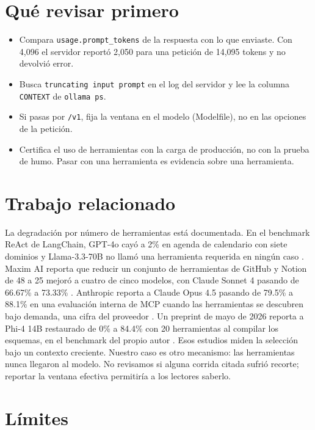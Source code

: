 \documentclass[10pt]{article}
\begin{document}
\section{Qué revisar primero}

\begin{itemize}
\item Compara \texttt{usage.prompt\_tokens} de la respuesta con lo que enviaste. Con 4,096 el servidor reportó 2,050 para una petición de 14,095 tokens y no devolvió error.
\item Busca \texttt{truncating input prompt} en el log del servidor y lee la columna \texttt{CONTEXT} de \texttt{ollama ps}.
\item Si pasas por \texttt{/v1}, fija la ventana en el modelo (Modelfile), no en las opciones de la petición.
\item Certifica el uso de herramientas con la carga de producción, no con la prueba de humo. Pasar con una herramienta es evidencia sobre una herramienta.
\end{itemize}

\section{Trabajo relacionado}

La degradación por número de herramientas está documentada. En el benchmark ReAct de LangChain, GPT-4o cayó a 2\% en agenda de calendario con siete dominios y Llama-3.3-70B no llamó una herramienta requerida en ningún caso \cite{langchain}. Maxim AI reporta que reducir un conjunto de herramientas de GitHub y Notion de 48 a 25 mejoró a cuatro de cinco modelos, con Claude Sonnet 4 pasando de 66.67\% a 73.33\% \cite{maxim}. Anthropic reporta a Claude Opus 4.5 pasando de 79.5\% a 88.1\% en una evaluación interna de MCP cuando las herramientas se descubren bajo demanda, una cifra del proveedor \cite{anthropic}. Un preprint de mayo de 2026 reporta a Phi-4 14B restaurado de 0\% a 84.4\% con 20 herramientas al compilar los esquemas, en el benchmark del propio autor \cite{tscg}. Esos estudios miden la selección bajo un contexto creciente. Nuestro caso es otro mecanismo: las herramientas nunca llegaron al modelo. No revisamos si alguna corrida citada sufrió recorte; reportar la ventana efectiva permitiría a los lectores saberlo.

\section*{Límites}
\end{document}
